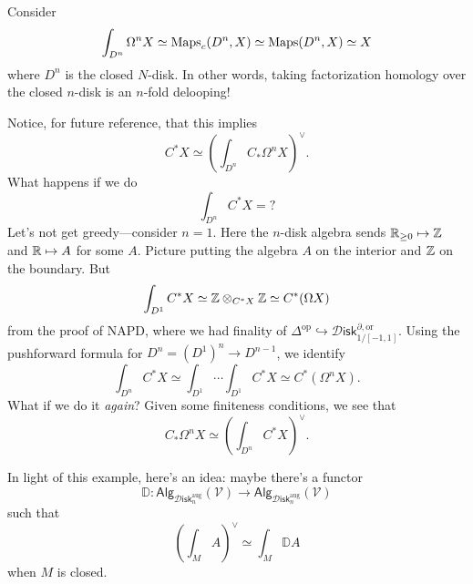 \documentclass{amsart}
\begin{document}
\begin{example}
    Consider
    \begin{equation*}
        \int_{D^n}\Omega^nX \simeq \operatorname{Maps}_c(D^n,X) \simeq \operatorname{Maps}(D^n,X)\simeq X
    \end{equation*}
    where $D^n$ is the closed $N$-disk. In other words, taking factorization
    homology over the closed $n$-disk is an $n$-fold delooping!

    Notice, for future reference, that this implies
    \begin{equation*}
        C^*X \simeq \left( \int_{D^n}C_*\Omega^nX \right)^\vee.
    \end{equation*}
    What happens if we do
    \begin{equation*}
        \int_{D^n}C^*X = ?
    \end{equation*}
    Let's not get greedy---consider $n=1$.
    Here the $n$-disk algebra sends $\mathbb{R}_{\geq 0}\mapsto \mathbb{Z}$ and $\mathbb{R}\mapsto A$ for some $A$.
    Picture putting the algebra $A$ on the interior and $\mathbb{Z}$ on the boundary.
    But
    \begin{equation*}
        \int_{D^1}C^*X\simeq\mathbb{Z}\otimes_{C^*X}\mathbb{Z} \simeq C^*(\Omega X)
    \end{equation*}
    from the proof of NAPD, where we had finality of $\Delta^\text{op}\hookrightarrow \mathcal{D}\mathsf{isk}_{1/[-1,1]}^{\partial,\text{or}}$.
    Using the pushforward formula for $D^n=(D^1)^n\to D^{n-1}$, we identify
    \begin{equation*}
        \int_{D^n} C^*X \simeq \int_{D^1}\cdots \int_{D^1}C^*X \simeq C^*(\Omega^nX).
    \end{equation*}
    What if we do it \textit{again}? Given some finiteness conditions, we see that
    \begin{equation*}
        C_*\Omega^n X \simeq \left( \int_{D^n}C^*X \right)^\vee.
    \end{equation*}
\end{example}

In light of this example, here's an idea: maybe there's a functor
\begin{equation*}
    \mathbb{D}:\mathsf{Alg}_{\mathcal{D}\mathsf{isk}_n^\text{aug}}(\mathcal{V}) \to \mathsf{Alg}_{\mathcal{D}\mathsf{isk}_n^\text{aug}}(\mathcal{V})
\end{equation*}
such that
\begin{equation*}
    \left( \int_M A \right)^\vee \simeq \int_M \mathbb{D}A
\end{equation*}
when $M$ is closed.
\end{document}
